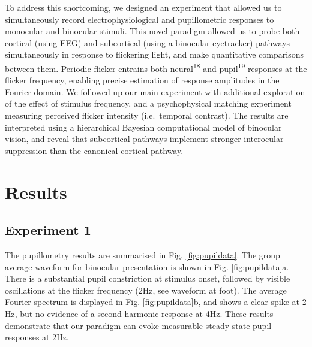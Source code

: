 \documentclass[
]{article}
\begin{document}
To address this shortcoming, we designed an experiment that allowed us to simultaneously record electrophysiological and pupillometric responses to monocular and binocular stimuli. This novel paradigm allowed us to probe both cortical (using EEG) and subcortical (using a binocular eyetracker) pathways simultaneously in response to flickering light, and make quantitative comparisons between them. Periodic flicker entrains both neural\textsuperscript{18} and pupil\textsuperscript{19} responses at the flicker frequency, enabling precise estimation of response amplitudes in the Fourier domain. We followed up our main experiment with additional exploration of the effect of stimulus frequency, and a psychophysical matching experiment measuring perceived flicker intensity (i.e.~temporal contrast). The results are interpreted using a hierarchical Bayesian computational model of binocular vision, and reveal that subcortical pathways implement stronger interocular suppression than the canonical cortical pathway.

\hypertarget{results}{%
\section{Results}\label{results}}

\hypertarget{experiment-1}{%
\subsection{Experiment 1}\label{experiment-1}}

The pupillometry results are summarised in Fig. \ref{fig:pupildata}. The group average waveform for binocular presentation is shown in Fig. \ref{fig:pupildata}a. There is a substantial pupil constriction at stimulus onset, followed by visible oscillations at the flicker frequency (2Hz, see waveform at foot). The average Fourier spectrum is displayed in Fig. \ref{fig:pupildata}b, and shows a clear spike at 2 Hz, but no evidence of a second harmonic response at 4Hz. These results demonstrate that our paradigm can evoke measurable steady-state pupil responses at 2Hz.
\end{document}
